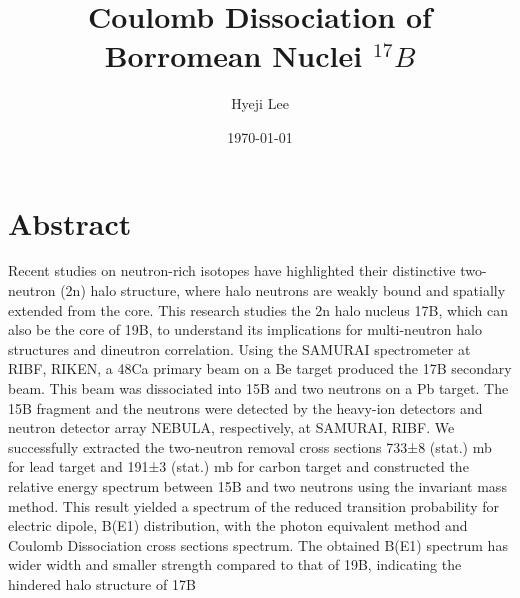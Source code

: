 \documentclass{book}[12pt]
\title{Coulomb Dissociation of Borromean Nuclei ${}^{17}B$}
\author{Hyeji Lee}
\date{\today}
\begin{document}
\frontmatter
\maketitle
{}
\clearpage

\thispagestyle{empty}

\clearpage

\thispagestyle{empty}
\chapter*{Abstract}
Recent studies on neutron-rich isotopes have highlighted their distinctive two- neutron (2n) halo structure, where halo neutrons are weakly bound and spatially extended from the core. This research studies the 2n halo nucleus 17B, which can also be the core of 19B, to understand its implications for multi-neutron halo structures and dineutron correlation. Using the SAMURAI spectrometer at RIBF, RIKEN, a 48Ca primary beam on a Be target produced the 17B secondary beam. This beam was dissociated into 15B and two neutrons on a Pb target. The 15B fragment and the neutrons were detected by the heavy-ion detectors and neutron detector array NEBULA, respectively, at SAMURAI, RIBF. We successfully extracted the two-neutron removal cross sections 733±8 (stat.) mb for lead target and 191±3 (stat.) mb for carbon target and constructed the relative energy spectrum between 15B and two neutrons using the invariant mass method. This result yielded a spectrum of the reduced transition probability for electric dipole, B(E1) distribution, with the photon equivalent method and Coulomb Dissociation cross sections spectrum. The obtained B(E1) spectrum has wider width and smaller strength compared to that of 19B, indicating the hindered halo structure of 17B

\clearpage

\tableofcontents
\listoffigures
\listoftables


\mainmatter
{}









%

\printbibliography

\backmatter

 
\end{document}
